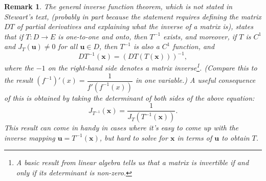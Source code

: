\documentclass[12pt,letterpaper]{article}
\newtheorem{rem}[theorem]{Remark}
\newenvironment{remark}{\begin{rem}\rm}{\end{rem}}
\newcommand{\x}{\mathbf{x}}
\newcommand{\uu}{\mathbf{u}}
\begin{document}
\begin{remark}
The general inverse function theorem, which is not stated in Stewart's text, (probably in part because the statement requires defining the matrix $DT$ of partial derivatives and explaining what the inverse of a matrix is), states that if $T:D\to E$ is one-to-one and onto, then $T^{-1}$ exists, and moreover, if $T$ is $C^1$ {\em and} $J_T(\uu)\neq 0$ for all $\uu\in D$, then $T^{-1}$ is {\em also} a $C^1$ function, and
\[
DT^{-1}(\x) = (DT(T(\x)))^{-1},
\]
where the $-1$ on the right-hand side denotes a matrix inverse\footnote{A basic result from linear algebra tells us that a matrix is invertible if and only if its determinant is non-zero.}. (Compare this to the result $(f^{-1})'(x) = \dfrac{1}{f'(f^{-1}(x))}$ in one variable.) A useful consequence of this is obtained by taking the determinant of both sides of the above equation:
\[
J_{T^{-1}}(\x) = \frac{1}{J_T(T^{-1}(\x))}.
\]
This result can come in handy in cases where it's easy to come up with the inverse mapping $\uu = T^{-1}(\x)$, but hard to solve for $\x$ in terms of $\uu$ to obtain $T$.
\end{remark}
\end{document}
